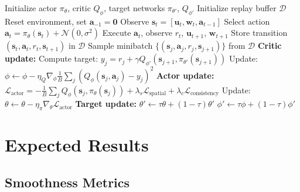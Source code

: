 \documentclass[11pt,a4paper]{article}
\theoremstyle{definition}
\begin{document}
\begin{algorithm}
\caption{MADDPG with Action Memory}
\begin{algorithmic}[1]
\STATE Initialize actor $\pi_\theta$, critic $Q_\phi$, target networks $\pi_{\theta'}$, $Q_{\phi'}$
\STATE Initialize replay buffer $\mathcal{D}$
    \STATE Reset environment, set $\mathbf{a}_{-1} = \mathbf{0}$
        \STATE Observe $\mathbf{s}_t = [\mathbf{u}_t, \mathbf{w}_t, \mathbf{a}_{t-1}]$
        \STATE Select action $\mathbf{a}_t = \pi_\theta(\mathbf{s}_t) + \mathcal{N}(0, \sigma^2)$
        \STATE Execute $\mathbf{a}_t$, observe $r_t$, $\mathbf{u}_{t+1}$, $\mathbf{w}_{t+1}$
        \STATE Store transition $(\mathbf{s}_t, \mathbf{a}_t, r_t, \mathbf{s}_{t+1})$ in $\mathcal{D}$
                \STATE Sample minibatch $\{(\mathbf{s}_j, \mathbf{a}_j, r_j, \mathbf{s}_{j+1})\}$ from $\mathcal{D}$
                \STATE \textbf{Critic update:}
                \STATE \quad Compute target: $y_j = r_j + \gamma Q_{\phi'}(\mathbf{s}_{j+1}, \pi_{\theta'}(\mathbf{s}_{j+1}))$
                \STATE \quad Update: $\phi \leftarrow \phi - \eta_Q \nabla_\phi \frac{1}{B}\sum_j (Q_\phi(\mathbf{s}_j, \mathbf{a}_j) - y_j)^2$
                \STATE \textbf{Actor update:}
                \STATE \quad $\mathcal{L}_{\text{actor}} = -\frac{1}{B}\sum_j Q_\phi(\mathbf{s}_j, \pi_\theta(\mathbf{s}_j)) + \lambda_s \mathcal{L}_{\text{spatial}} + \lambda_c \mathcal{L}_{\text{consistency}}$
                \STATE \quad Update: $\theta \leftarrow \theta - \eta_\pi \nabla_\theta \mathcal{L}_{\text{actor}}$
                \STATE \textbf{Target update:}
                \STATE \quad $\theta' \leftarrow \tau \theta + (1-\tau)\theta'$
                \STATE \quad $\phi' \leftarrow \tau \phi + (1-\tau)\phi'$
            \ENDFOR
        \ENDIF
    \ENDFOR
\ENDFOR
\end{algorithmic}
\end{algorithm}

\section{Expected Results}

\subsection{Smoothness Metrics}
\end{document}
